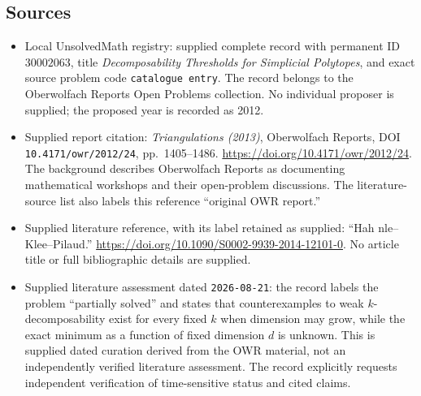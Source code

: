 \documentclass[11pt]{article}
\begin{document}
\subsection{Sources}
\begin{itemize}
\item Local UnsolvedMath registry: supplied complete record with permanent ID \(30002063\), title \emph{Decomposability Thresholds for Simplicial Polytopes}, and exact source problem code \texttt{catalogue entry}. The record belongs to the Oberwolfach Reports Open Problems collection. No individual proposer is supplied; the proposed year is recorded as 2012.
\item Supplied report citation: \emph{Triangulations (2013)}, Oberwolfach Reports, DOI \texttt{10.4171/owr/2012/24}, pp.\ 1405--1486. \url{https://doi.org/10.4171/owr/2012/24}. The background describes Oberwolfach Reports as documenting mathematical workshops and their open-problem discussions. The literature-source list also labels this reference ``original OWR report.''
\item Supplied literature reference, with its label retained as supplied: ``Hah nle--Klee--Pilaud.'' \url{https://doi.org/10.1090/S0002-9939-2014-12101-0}. No article title or full bibliographic details are supplied.
\item Supplied literature assessment dated \texttt{2026-08-21}: the record labels the problem ``partially solved'' and states that counterexamples to weak \(k\)-decomposability exist for every fixed \(k\) when dimension may grow, while the exact minimum as a function of fixed dimension \(d\) is unknown. This is supplied dated curation derived from the OWR material, not an independently verified literature assessment. The record explicitly requests independent verification of time-sensitive status and cited claims.
\end{itemize}
\end{document}
